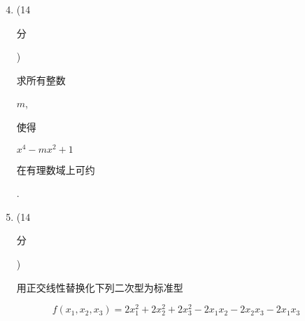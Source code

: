 \documentclass[10pt]{article}
\begin{document}
\begin{enumerate}
  \setcounter{enumi}{3}
  \item (14 \begin{CJK}{UTF8}{mj}分\end{CJK}) \begin{CJK}{UTF8}{mj}求所有整数\end{CJK} $m$, \begin{CJK}{UTF8}{mj}使得\end{CJK} $x^{4}-m x^{2}+1$ \begin{CJK}{UTF8}{mj}在有理数域上可约\end{CJK}.

  \item (14 \begin{CJK}{UTF8}{mj}分\end{CJK}) \begin{CJK}{UTF8}{mj}用正交线性替换化下列二次型为标准型\end{CJK}

\end{enumerate}
$$
f\left(x_{1}, x_{2}, x_{3}\right)=2 x_{1}^{2}+2 x_{2}^{2}+2 x_{3}^{2}-2 x_{1} x_{2}-2 x_{2} x_{3}-2 x_{1} x_{3}
$$
\end{document}
